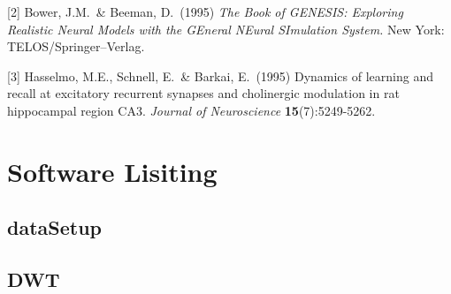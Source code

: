 \documentclass{article}
\begin{document}
[2] Bower, J.M.\ \& Beeman, D.\ (1995) {\it The Book of GENESIS:
  Exploring Realistic Neural Models with the GEneral NEural SImulation
  System.}  New York: TELOS/Springer--Verlag.

[3] Hasselmo, M.E., Schnell, E.\ \& Barkai, E.\ (1995) Dynamics of
learning and recall at excitatory recurrent synapses and cholinergic
modulation in rat hippocampal region CA3. {\it Journal of
  Neuroscience} {\bf 15}(7):5249-5262.


\section{Software Lisiting}\label{Software_Lisiting}
\subsection{dataSetup}
%
\subsection{DWT}
%
\end{document}
